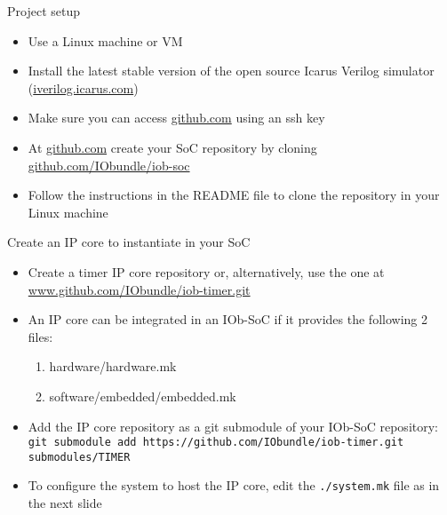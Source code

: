 \documentclass [xcolor=svgnames, t] {beamer}
\begin{document}
\begin{frame}{Project setup}
\begin{center}
  \begin{itemize}
    \item Use a Linux machine or VM
    \item Install the latest stable version of the open source Icarus Verilog simulator (\url{iverilog.icarus.com})
    \item Make sure you can access \url{github.com} using an ssh key
    \item At \url{github.com} create your SoC repository by cloning \url{github.com/IObundle/iob-soc}
    \item Follow the instructions in the README file to clone the repository in your Linux machine
  \end{itemize}
\end{center}
\end{frame}


\begin{frame}{Create an IP core to instantiate in your SoC}
  \begin{itemize}
  \item Create a timer IP core repository or, alternatively, use the one at \url{www.github.com/IObundle/iob-timer.git}
  \item An IP core can be integrated in an IOb-SoC if it provides the following 2 files: 
    \begin{enumerate}
    \item hardware/hardware.mk
    \item software/embedded/embedded.mk
    \end{enumerate}
  \item Add the IP core repository as a git submodule of your IOb-SoC repository:\\
    {\small \tt git submodule add https://github.com/IObundle/iob-timer.git submodules/TIMER}
  \item To configure the system to host the IP core, edit the {\tt ./system.mk} file as in the next slide
  \end{itemize}
\end{frame}

\lstset{basicstyle=\ttfamily,columns=fullflexible}
\end{document}
